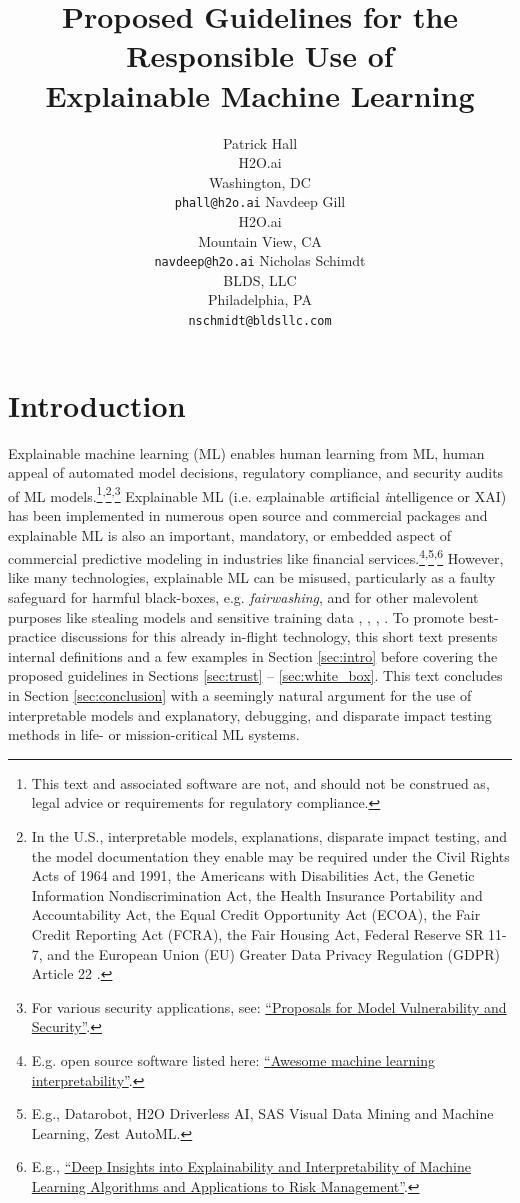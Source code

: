 \documentclass{article}
\title{Proposed Guidelines for the Responsible Use of\\ Explainable Machine Learning}
\author{Patrick Hall\\
H2O.ai\\
Washington, DC\\
\texttt{phall@h2o.ai} \And
Navdeep Gill\\
H2O.ai\\
Mountain View, CA\\
\texttt{navdeep@h2o.ai} \And
Nicholas Schimdt\\
BLDS, LLC\\
Philadelphia, PA\\
\texttt{nschmidt@bldsllc.com}
}
\begin{document}
\maketitle

\section{Introduction}

Explainable machine learning (ML) enables human learning from ML, human appeal of automated model decisions, regulatory compliance, and security audits of ML models.\footnote{\scriptsize{This text and associated software are not, and should not be construed as, legal advice or requirements for regulatory compliance.}}\textsuperscript{,}\footnote{\scriptsize{In the U.S., interpretable models, explanations, disparate impact testing, and the model documentation they enable may be required under the Civil Rights Acts of 1964 and 1991, the Americans with Disabilities Act, the Genetic Information Nondiscrimination Act, the Health Insurance Portability and Accountability Act, the Equal Credit Opportunity Act (ECOA), the Fair Credit Reporting Act (FCRA), the Fair Housing Act, Federal Reserve SR 11-7, and the European Union (EU) Greater Data Privacy Regulation (GDPR) Article 22 \cite{ff_interpretability}}.\label{fn:regs}}\textsuperscript{,}\footnote{\scriptsize{For various security applications, see: \href{https://www.oreilly.com/ideas/proposals-for-model-vulnerability-and-security}{``Proposals for Model Vulnerability and Security''}.}} Explainable ML (i.e. e\textit{x}plainable \textit{a}rtificial \textit{i}ntelligence or XAI) has been implemented in numerous open source and commercial packages and explainable ML is also an important, mandatory, or embedded aspect of commercial predictive modeling in industries like financial services.\footnote{\scriptsize{E.g. open source software listed here: \href{https://github.com/jphall663/awesome-machine-learning-interpretability}{``Awesome machine learning interpretability''}.}}\textsuperscript{,}\footnote{\scriptsize{E.g.,  Datarobot, H2O Driverless AI, SAS Visual Data Mining and Machine Learning, Zest AutoML.}}\textsuperscript{,}\footnote{\scriptsize{E.g., \href{https://ww2.amstat.org/meetings/jsm/2019/onlineprogram/AbstractDetails.cfm?abstractid=303053}{``Deep Insights into Explainability and Interpretability of Machine Learning Algorithms and Applications to Risk Management''}.}\label{fn:chen}} However, like many technologies, explainable ML can be misused, particularly as a faulty safeguard for harmful black-boxes, e.g. \textit{fairwashing}, and for other malevolent purposes like stealing models and sensitive training data \cite{fair_washing}, \cite{please_stop}, \cite{membership_inference}, \cite{model_stealing}. To promote best-practice discussions for this already in-flight technology, this short text presents internal definitions and a few examples in Section \ref{sec:intro} before covering the proposed guidelines in Sections \ref{sec:trust} -- \ref{sec:white_box}. This text concludes in Section \ref{sec:conclusion} with a seemingly natural argument for the use of interpretable models and explanatory, debugging, and disparate impact testing methods in life- or mission-critical ML systems.
\end{document}
